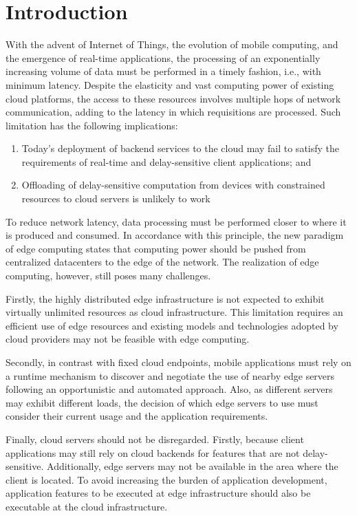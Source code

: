 \section{Introduction}

With the advent of Internet of Things, the evolution of mobile computing, and the emergence of real-time applications, the processing of an exponentially increasing volume of data must be performed in a timely fashion, i.e., with minimum latency. Despite the elasticity and vast computing power of existing cloud platforms, the access to these resources involves multiple hops of network communication, adding to the latency in which requisitions are processed. Such limitation has the following implications:

\begin{enumerate}

\item Today's deployment of backend services to the cloud may fail to satisfy the requirements of real-time and delay-sensitive client applications; and

\item Offloading of delay-sensitive computation from devices with constrained resources to cloud servers is unlikely to work

\end{enumerate}

To reduce network latency, data processing must be performed closer to where it is produced and consumed. In accordance with this principle, the new paradigm of edge computing states that computing power should be pushed from centralized datacenters to the edge of the network. The realization of edge computing, however, still poses many challenges. 

Firstly, the highly distributed edge infrastructure is not expected to exhibit virtually unlimited resources as cloud infrastructure. This limitation requires an efficient use of edge resources and existing models and technologies adopted by cloud providers may not be feasible with edge computing.

Secondly, in contrast with fixed cloud endpoints, mobile applications must rely on a runtime mechanism to discover and negotiate the use of nearby edge servers following an opportunistic and automated approach. Also, as different servers may exhibit different loads, the decision of which edge servers to use must consider their current usage and the application requirements.

Finally, cloud servers should not be disregarded. Firstly, because client applications may still rely on cloud backends for features that are not delay-sensitive. Additionally, edge servers may not be available in the area where the client is located. To avoid increasing the burden of application development, application features to be executed at edge infrastructure should also be executable at the cloud infrastructure.

